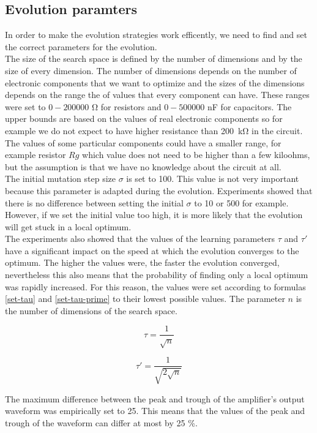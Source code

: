 \subsection{Evolution paramters}
In order to make the evolution strategies work efficently, we need to find and set the correct parameters for the evolution.\\
The size of the search space is defined by the number of dimensions and by the size of every dimension. The number of dimensions depends on the number of electronic components that we want to optimize and the sizes of the dimensions depends on the range the of values that every component can have. These ranges were set to $0 - 200000$ \si{\ohm} for resistors and $0 - 500000$ \si{\nano\farad} for capacitors. The upper bounds are based on the values of real electronic components so for example we do not expect to have higher resistance than \SI{200}{\kilo\ohm} in the circuit. The values of some particular components could have a smaller range, for example resistor $Rg$ which value does not need to be higher than a few kiloohms, but the assumption is that we have no knowledge about the circuit at all.\\
The initial mutation step size $\sigma$ is set to 100. This value is not very important because this parameter is adapted during the evolution. Experiments showed that there is no difference between setting the initial $\sigma$ to 10 or 500 for example. However, if we set the initial value too high, it is more likely that the evolution will get stuck in a local optimum.\\
The experiments also showed that the values of the learning parameters $\tau$ and $\tau'$ have a significant impact on the speed at which the evolution converges to the optimum. The higher the values were, the faster the evolution converged, nevertheless this also means that the probability of finding only a local optimum was rapidly increased. For this reason, the values were set according to formulas \ref{set-tau} and \ref{set-tau-prime} to their lowest possible values. The parameter $n$ is the number of dimensions of the search space.

\begin{equation} \label{set-tau}
    \tau = \frac{1}{\sqrt{n}}
\end{equation}

\begin{equation} \label{set-tau-prime}
    \tau' = \frac{1}{\sqrt{2\sqrt{n}}}
\end{equation}

The maximum difference between the peak and trough of the amplifier's output waveform was empirically set to 25. This means that the values of the peak and trough of the waveform can differ at most by 25 \%.

